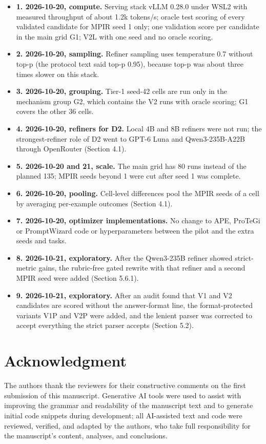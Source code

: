 \documentclass{ieeeaccess}
\begin{document}
\begin{itemize}
\item \textbf{1. 2026-10-20, compute.} Serving stack vLLM 0.28.0 under WSL2 with measured throughput of about 1.2k tokens/s; oracle test scoring of every validated candidate for MPIR seed 1 only; one validation score per candidate in the main grid G1; V2L with one seed and no oracle scoring.
\item \textbf{2. 2026-10-20, sampling.} Refiner sampling uses temperature 0.7 without top-p (the protocol text said top-p 0.95), because top-p was about three times slower on this stack.
\item \textbf{3. 2026-10-20, grouping.} Tier-1 seed-42 cells are run only in the mechanism group G2, which contains the V2 runs with oracle scoring; G1 covers the other 36 cells.
\item \textbf{4. 2026-10-20, refiners for D2.} Local 4B and 8B refiners were not run; the strongest-refiner role of D2 went to GPT-6 Luna and Qwen3-235B-A22B through OpenRouter (Section 4.1).
\item \textbf{5. 2026-10-20 and 21, scale.} The main grid has 80 runs instead of the planned 135; MPIR seeds beyond 1 were cut after seed 1 was complete.
\item \textbf{6. 2026-10-20, pooling.} Cell-level differences pool the MPIR seeds of a cell by averaging per-example outcomes (Section 4.1).
\item \textbf{7. 2026-10-20, optimizer implementations.} No change to APE, ProTeGi or PromptWizard code or hyperparameters between the pilot and the extra seeds and tasks.
\item \textbf{8. 2026-10-21, exploratory.} After the Qwen3-235B refiner showed strict-metric gains, the rubric-free gated rewrite with that refiner and a second MPIR seed were added (Section 5.6.1).
\item \textbf{9. 2026-10-21, exploratory.} After an audit found that V1 and V2 candidates are scored without the answer-format line, the format-protected variants V1P and V2P were added, and the lenient parser was corrected to accept everything the strict parser accepts (Section 5.2).
\end{itemize}


\section*{Acknowledgment}
The authors thank the reviewers for their constructive comments on the first submission of this manuscript. Generative AI tools were used to assist with improving the grammar and readability of the manuscript text and to generate initial code snippets during development; all AI-assisted text and code were reviewed, verified, and adapted by the authors, who take full responsibility for the manuscript's content, analyses, and conclusions.
\end{document}
